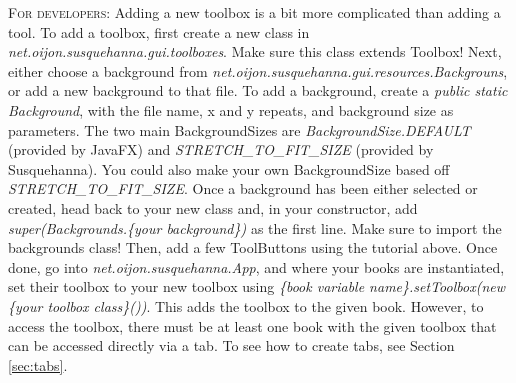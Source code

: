 \documentclass{report}
\begin{document}
	\begin{tcolorbox}[width=1\textwidth]
		\textsc{For developers:} Adding a new toolbox is a bit more complicated than adding a tool. To add a toolbox, first create a new class in \emph{net.oijon.susquehanna.gui.toolboxes}. Make sure this class extends Toolbox! Next, either choose a background from \emph{net.oijon.susquehanna.gui.resources.Backgrouns}, or add a new background to that file. To add a background, create a \emph{public static Background}, with the file name, x and y repeats, and background size as parameters. The two main BackgroundSizes are \emph{BackgroundSize.DEFAULT} (provided by JavaFX) and \emph{STRETCH\_TO\_FIT\_SIZE} (provided by Susquehanna). You could also make your own BackgroundSize based off \emph{STRETCH\_TO\_FIT\_SIZE}. Once a background has been either selected or created, head back to your new class and, in your constructor, add \emph{super(Backgrounds.\{your background\})} as the first line. Make sure to import the backgrounds class! Then, add a few ToolButtons using the tutorial above. Once done, go into \emph{net.oijon.susquehanna.App}, and where your books are instantiated, set their toolbox to your new toolbox using \emph{\{book variable name\}.setToolbox(new \{your toolbox class\}())}. This adds the toolbox to the given book. However, to access the toolbox, there must be at least one book with the given toolbox that can be accessed directly via a tab. To see how to create tabs, see Section \ref{sec:tabs}.
	\end{tcolorbox}
\end{document}
